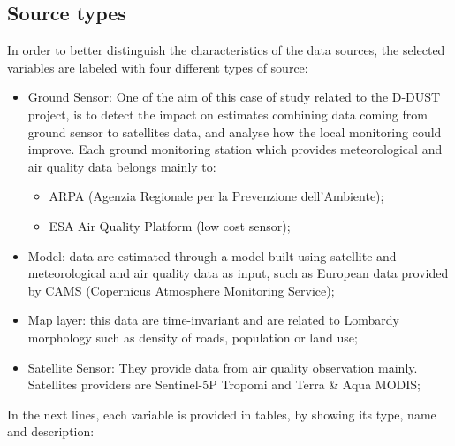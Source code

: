 \subsection{Source types}
In order to better distinguish the characteristics of the data sources, the selected variables are labeled with four different types of source:
\begin{itemize}

\item Ground Sensor: One of the aim of this case of study related to the D-DUST project, is to detect the impact on estimates combining data coming from ground sensor to satellites data, and analyse how the local monitoring could improve.  
Each ground monitoring station which provides meteorological and air quality data belongs mainly to: 
\begin{itemize}
    \item ARPA (Agenzia Regionale per la Prevenzione dell'Ambiente);
    \item ESA Air Quality Platform (low cost sensor)\cite{esasensor};
\end{itemize}  
\item Model: data are estimated through a model built using satellite and meteorological and air quality data as input, such as European data provided by CAMS (Copernicus Atmosphere Monitoring Service);
\item Map layer: this data are time-invariant and are related to Lombardy morphology such as density of roads, population or land use; 
\item Satellite Sensor: They provide data from air quality observation mainly. Satellites providers are Sentinel-5P Tropomi and Terra \& Aqua MODIS;
\end{itemize}
\bigbreak

In the next lines, each variable is provided in tables, by showing its type, name and description:

